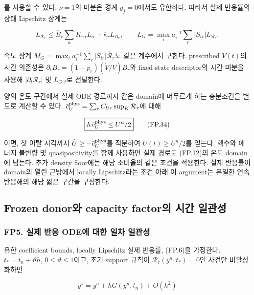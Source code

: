 를 사용할 수 있다. \(\nu=1\)의 미분은 경계 \(y_j=0\)에서도 유한하다. 따라서 실제 반응률의 상태 Lipschitz 상계는

\[
L_{\mathcal R_r}
\le
\overline B_r\sum_\alpha K_{r\alpha}L_\alpha
+\overline\kappa_r L_{B_r},
\qquad
L_G=\max_i a_i^{-1}\sum_r|S_{ir}|L_{\mathcal R_r}.
\tag{FP.33}
\]

속도 상계 \(M_G=\max_i a_i^{-1}\sum_r|S_{ir}|\overline{\mathcal R}_r\)도 같은 계수에서 구한다. prescribed \(V(t)\)의 시간 의존성은 \(\partial_tB_r=(1-p_r)(\dot V/V)B_r\)와 fixed-state descriptor의 시간 미분을 사용해 \(|\partial_t\mathcal R_r|\) 및 \(L_{G,t}\)로 전달한다.

양의 온도 구간에서 실제 ODE 경로까지 같은 domain에 머무르게 하는 충분조건을 별도로 계산할 수 있다. \(\overline c_U^{\rm phys}=\sum_r C_{Ur}\sup_K\mathcal R_r\)에 대해

\[
\boxed{
h\,\overline c_U^{\rm phys}\le U^n/2
}
\tag{FP.34}
\]

이면, 첫 이탈 시각까지 \(\dot U\ge-\overline c_U^{\rm phys}\)를 적분하여 \(U(t)\ge U^n/2\)를 얻는다. 핵수와 에너지 불변량 및 quasipositivity를 함께 사용하면 실제 경로도 (FP.12)의 온도 domain에 남는다. 추가 density floor에는 해당 소비율의 같은 조건을 적용한다. 실제 반응률이 domain의 열린 근방에서 locally Lipschitz라는 조건 아래 이 argument는 유일한 연속 반응해의 해당 짧은 구간을 구성한다.

\hypertarget{frozen-donoruxc640-capacity-factoruxc758-uxc2dcuxac04-uxc77cuxad00uxc131}{%
\subsection{Frozen donor와 capacity factor의 시간 일관성}\label{frozen-donoruxc640-capacity-factoruxc758-uxc2dcuxac04-uxc77cuxad00uxc131}}

\hypertarget{fp5.-uxc2e4uxc81c-uxbc18uxc751-odeuxc5d0-uxb300uxd55c-uxc77cuxcc28-uxc77cuxad00uxc131}{%
\subsubsection{FP5. 실제 반응 ODE에 대한 일차 일관성}\label{fp5.-uxc2e4uxc81c-uxbc18uxc751-odeuxc5d0-uxb300uxd55c-uxc77cuxcc28-uxc77cuxad00uxc131}}

유한 coefficient bounds, locally Lipschitz 실제 반응률, (FP.6)을 가정한다. \(t_*=t_n+\vartheta h\), \(0\le\vartheta\le1\)이고, 초기 support 규칙이 \(\mathcal R_r(y^n,t_*)=0\)인 사건만 비활성화하면

\[
y^\star
=
y^n+hG(y^n,t_n)+O(h^2)
\tag{FP.35}
\]

